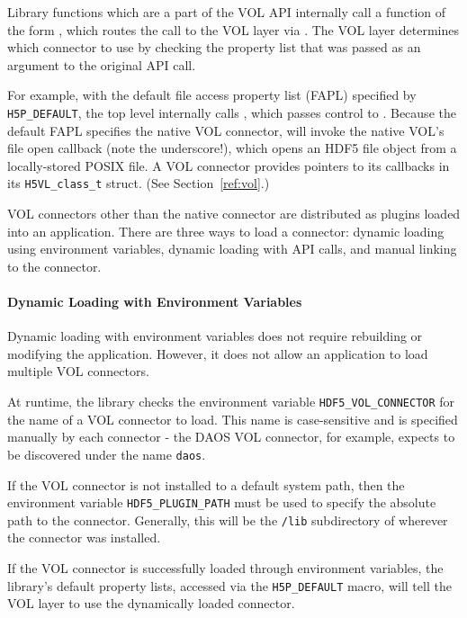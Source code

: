 Library functions which are a part of the VOL API internally call a function of the form , which routes the call to the VOL layer via . The VOL layer determines which connector to use by checking the property list that was passed as an argument to the original API call.

For example, with the default file access property list (FAPL) specified by \texttt{H5P\_DEFAULT}, the top level  internally calls , which passes control to . Because the default FAPL specifies the native VOL connector,  will invoke the native VOL's file open callback  (note the underscore!), which opens an HDF5 file object from a locally-stored POSIX file. A VOL connector provides pointers to its callbacks in its \texttt{H5VL\_class\_t} struct. (See Section~\ref{ref:vol}.)

VOL connectors other than the native connector are distributed as plugins loaded into an application. There are three ways to load a connector: dynamic loading using environment variables, dynamic loading with API calls, and manual linking to the connector.

\paragraph{Dynamic Loading with Environment Variables} Dynamic loading with environment variables does not require rebuilding or modifying the application. However, it does not allow an application to load multiple VOL connectors.

At runtime, the library checks the environment variable \texttt{HDF5\_VOL\_CONNECTOR} for the name of a VOL connector to load. This name is case-sensitive and is specified manually by each connector - the DAOS VOL connector, for example, expects to be discovered under the name \texttt{daos}. 

If the VOL connector is not installed to a default system path, then the environment variable \texttt{HDF5\_PLUGIN\_PATH} must be used to specify the absolute path to the connector. Generally, this will be the \texttt{/lib} subdirectory of wherever the connector was installed.

If the VOL connector is successfully loaded through environment variables, the library's default property lists, accessed via the \texttt{H5P\_DEFAULT} macro, will tell the VOL layer to use the dynamically loaded connector.

